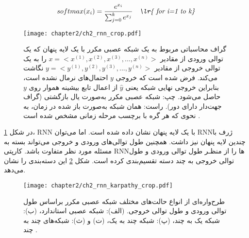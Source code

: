  \begin{equation}\label{softmaxformula}
 	softmax(x_i) = \frac{e^{x_i}}{\sum_{j=0}^{k}{e^{x_j}}} \quad \textit{\lr{ for i=1 to k}}
 \end{equation}
 
 
 \begin{figure}%
 	\centering
 	\texttt{[image: chapter2/ch2\_rnn\_crop.pdf]}
 	\caption[گراف محاسباتی شبکه عصبی مکرر]
 	{
 		 گراف محاسباتی مربوط به یک شبکه عصبی مکرر با یک لایه پنهان که یک توالی ورودی از مقادیر 
 		 $ x = <x^{(1)}, x^{(2)}, x^{(3)}, ..., x^{(n)}> $
 		 را به یک توالی خروجی از مقادیر 
 		 $ y = <y^{(1)}, y^{(2)}, y^{(3)}, ..., y^{(n)}> $
 		 نگاشت می‌کند. فرض شده است که خروجی $ y $ احتمال‌های نرمال نشده است، بنابراین خروجی نهایی شبکه یعنی $ \hat{y} $ از اعمال تابع بیشینه هموار روی $ y $  حاصل می‌شود. چپ: شبکه عصبی مکرر به‌صورت یال بازگشتی (گراف جهت‌دار دارای دور). راست: همان شبکه به‌صورت باز شده در زمان، به نحوی که هر گره با برچسب مرحله زمانی مشخص شده است \cite{Goodfellow-et-al-2016}.
 	}
 	\label{ch2_rnn.pdf}
 \end{figure}
 
 
 
 در ‏شکل \ref{ch2_rnn.pdf}، \gls{RNN} با یک لایه پنهان نشان داده شده است. اما می‌توان \gls{RNN}ژرف با چندین لایه پنهان نیز داشت. همچنین طول توالی‌‌های ورودی و خروجی می‌تواند بسته به مسئله مورد نظر متفاوت باشد. کارپتی
 	\cite{Karpathy2016}
  \gls{RNN}ها را از منظـر طول توالی ورودی و طول توالی خروجی به چند دسته تقسیم‌بندی کرده است. شکل \ref{ch2_karpathy_rnn_crop.pdf} این دسته‌بندی را نشان می‌دهد.
 
 
 \begin{figure}%
 	\centering
 	\texttt{[image: chapter2/ch2\_rnn\_karpathy\_crop.pdf]}
 	\caption[انواع مختلف شبکه عصبی مکرر بر اساس طول توالی ورودی و خروجی]
 	{
 طرح‌واره‌ای از انواع حالت‌های مختلف شبکه عصبی مکرر براساس طول توالی ورودی و طول توالی خروجی. (الف): شبکه عصبی استاندارد، (ب): شبکه یک به چند، (پ): شبکه چند به یک، (ت) و (ث): شبکه‌های چند به چند \cite{Karpathy2016}. 
 	}
 	\label{ch2_karpathy_rnn_crop.pdf}
 \end{figure}
 
